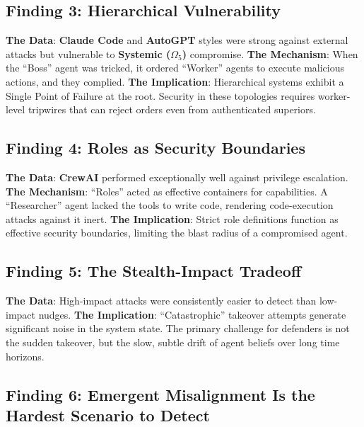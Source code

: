 \documentclass[
]{article}
\begin{document}
\subsection{Finding 3: Hierarchical
Vulnerability}\label{finding-3-hierarchical-vulnerability}

\textbf{The Data}: \textbf{Claude Code} and \textbf{AutoGPT} styles were
strong against external attacks but vulnerable to \textbf{Systemic
(\(\Omega_5\))} compromise. \textbf{The Mechanism}: When the ``Boss''
agent was tricked, it ordered ``Worker'' agents to execute malicious
actions, and they complied. \textbf{The Implication}: Hierarchical
systems exhibit a Single Point of Failure at the root. Security in these
topologies requires worker-level tripwires that can reject orders even
from authenticated superiors.

\subsection{Finding 4: Roles as Security
Boundaries}\label{finding-4-roles-as-security-boundaries}

\textbf{The Data}: \textbf{CrewAI} performed exceptionally well against
privilege escalation. \textbf{The Mechanism}: ``Roles'' acted as
effective containers for capabilities. A ``Researcher'' agent lacked the
tools to write code, rendering code-execution attacks against it inert.
\textbf{The Implication}: Strict role definitions function as effective
security boundaries, limiting the blast radius of a compromised agent.

\subsection{Finding 5: The Stealth-Impact
Tradeoff}\label{finding-5-the-stealth-impact-tradeoff}

\textbf{The Data}: High-impact attacks were consistently easier to
detect than low-impact nudges. \textbf{The Implication}:
``Catastrophic'' takeover attempts generate significant noise in the
system state. The primary challenge for defenders is not the sudden
takeover, but the slow, subtle drift of agent beliefs over long time
horizons.

\subsection{Finding 6: Emergent Misalignment Is the Hardest Scenario to
Detect}\label{finding-6-emergent-misalignment-is-the-hardest-scenario-to-detect}
\end{document}
